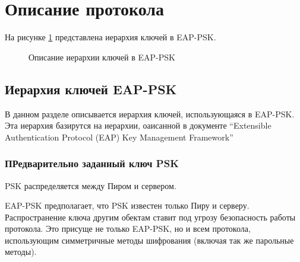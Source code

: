 \newpage
\section{Описание протокола}

На рисунке \ref{img:key_hierarchy} представлена иерархия ключей в EAP-PSK.

\begin{figure}[h!]
\caption{Описание иерархии ключей в EAP-PSK}
\label{img:key_hierarchy}
\end{figure}

\subsection{Иерархия ключей EAP-PSK}

В данном разделе описывается иерархия ключей, использующаяся в EAP-PSK. Эта иерархия базирутся на иерархии, оаисанной в документе ``Extensible Authentication Protocol (EAP) Key Management Framework''

\subsubsection{ПРедварительно заданный ключ PSK}

PSK распределяется между Пиром и сервером.

EAP-PSK предполагает, что PSK известен только Пиру и серверу. Распространение ключа другим обектам ставит под угрозу безопасность работы протокола. Это присуще не только EAP-PSK, но и всем протокола, использующим симметричные методы шифрования (включая так же парольные методы).

